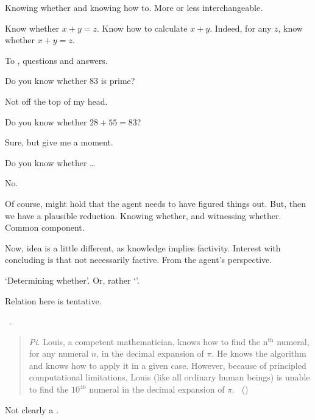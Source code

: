 \begin{note}
  Knowing whether and knowing how to.
  More or less interchangeable.

  Know whether \(x + y = z\).
  Know how to calculate \(x + y\).
  Indeed, for any \(z\), know whether \(x + y = z\).
\end{note}

\begin{note}
  To , questions and answers.

  Do you know whether \(83\) is prime?

  Not off the top of my head.

  Do you know whether \(28 + 55 = 83\)?

  Sure, but give me a moment.

  Do you know whether \dots

  No.

  Of course, might hold that the agent needs to have figured things out.
  But, then we have a plausible reduction.
  Knowing whether, and witnessing whether.
  Common component.

  Now, idea is a little different, as knowledge implies factivity.
  Interest with concluding is that not necessarily factive.
  From the agent's perspective.

  `Determining whether'.
  Or, rather `'.
\end{note}

\begin{note}
  Relation here is tentative.

  ~\cite{Bengson:2011th}.
  \begin{quote}
    \emph{Pi}.
    Louis, a competent mathematician, knows how to find the n\(^{\text{th}}\) numeral, for any numeral \(n\), in the decimal expansion of \(\pi\).
    He knows the algorithm and knows how to apply it in a given case.
    However, because of principled computational limitations, Louis (like all ordinary human beings) is unable to find the \(10^{46}\) numeral in the decimal expansion of \(\pi\).%
    \mbox{ }\hfill\mbox{(\citeyear[170]{Bengson:2011th})}
  \end{quote}

  Not clearly a \fc{}.
\end{note}

